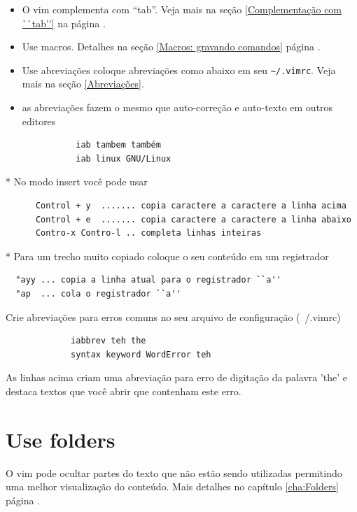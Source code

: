 \documentclass[10pt,a4paper,openany]{book}
\begin{document}
\begin{itemize}
\item O vim complementa com ``tab''. Veja mais na seção \ref{Complementação com ``tab''} na página \pageref{Complementação com ``tab''}.
\item Use macros. Detalhes na seção \ref{Macros: gravando comandos}
página \pageref{Macros: gravando comandos}.
\item Use abreviações coloque abreviações como abaixo em seu \verb|~/.vimrc|. Veja mais na seção \ref{Abreviações}.
\item as abreviações fazem o mesmo que auto-correção e auto-texto em outros editores
\end{itemize}

\begin{verbatim}
			  iab tambem também
			  iab linux GNU/Linux
\end{verbatim}



* No modo insert você pode usar

\begin{verbatim}
	  Control + y  ....... copia caractere a caractere a linha acima
	  Control + e  ....... copia caractere a caractere a linha abaixo
	  Contro-x Contro-l .. completa linhas inteiras
\end{verbatim}

* Para um trecho muito copiado coloque o seu conteúdo em um registrador

\begin{verbatim}
  "ayy ... copia a linha atual para o registrador ``a''
  "ap  ... cola o registrador ``a''
\end{verbatim}

Crie abreviações para erros comuns no seu arquivo de configuração (~/.vimrc)

\begin{verbatim}
			 iabbrev teh the
			 syntax keyword WordError teh
\end{verbatim}

As linhas acima criam uma abreviação para erro de digitação da palavra 'the'
e destaca textos que você abrir que contenham este erro.

\section{Use folders}\label{sec:Use folders}

O vim pode ocultar partes do texto que não estão sendo utilizadas permitindo
uma melhor visualização do conteúdo. Mais detalhes no capítulo
\ref{cha:Folders} página \pageref{cha:Folders}.
\end{document}
